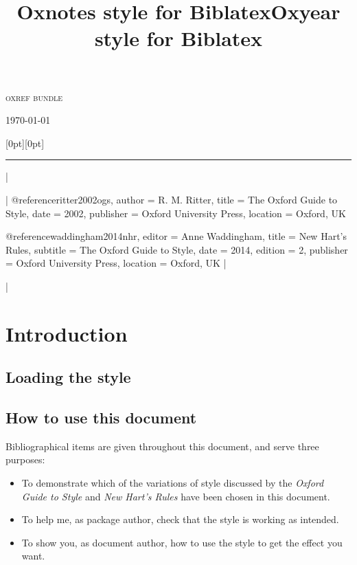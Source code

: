 \documentclass[extrafontsizes,11pt,a4paper,oneside]{memoir}
\title{Oxnotes style for Biblatex}|
\title{Oxyear style for Biblatex}|
\begin{document}
\thispagestyle{empty}
\begin{adjustwidth}{.2\textwidth}{0pt}
  \sffamily\setlength{\parindent}{0pt}%
  \LARGE\textsc{oxref bundle}
  
  \LARGE\thetitle
  
  \bigskip
  \Large\theauthor
  
  \bigskip
  \Large\ifx\undefined\thedate\today\else\thedate\fi
\end{adjustwidth}

\noindent
\hspace*{.1\textwidth}\raisebox{0pt}[0pt][0pt]{\rule{\normalrulethickness}{\textheight}}

\newpage
\tableofcontents*
|


\todoc[src]|
@reference{ritter2002ogs,
  author = {R. M. Ritter},
  title = {The {Oxford} Guide to Style},
  date = {2002},
  publisher = {Oxford University Press},
  location = {Oxford, UK}
}

@reference{waddingham2014nhr,
  editor = {Anne Waddingham},
  title = {New {Hart's} Rules},
  subtitle = {The {Oxford} Guide to Style},
  date = {2014},
  edition = {2},
  publisher = {Oxford University Press},
  location = {Oxford, UK}
}
|

\todoc|
\chapter{Introduction}

\section{Loading the style}

\section{How to use this document}

Bibliographical items are given throughout this document, and serve three purposes:

\begin{itemize}
  \item
  To demonstrate which of the variations of style discussed by the
  \emph{Oxford Guide to Style} and \emph{New Hart's Rules} have been chosen
  in this document.
  \item
  To help me, as package author, check that the style is working as intended.
  \item
  To show you, as document author, how to use the style to get the effect you want.
\end{itemize}
\end{document}
